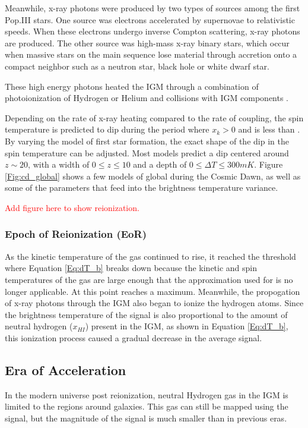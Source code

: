Meanwhile, x-ray photons were produced by two types of sources among the first Pop.III stars. One source was electrons accelerated by supernovae to relativistic speeds. When these electrons undergo inverse Compton scattering, x-ray photons are produced. The other source was high-mass x-ray binary stars, which occur when massive stars on the main sequence lose material through accretion onto a compact neighbor such as a neutron star, black hole or white dwarf star. 

These high energy photons heated the IGM through a combination of photoionization of Hydrogen or Helium and collisions with IGM components \cite{furlanetto_2006}. 

Depending on the rate of x-ray heating compared to the rate of \lya coupling, the spin temperature is predicted to dip during the period where $x_k>0$ and \tk is less than \tg. By varying the model of first star formation, the exact shape of the dip in the spin temperature can be adjusted. Most models predict a dip centered around $z\sim20$, with a width of $0 \leq z \leq 10$ and a depth of $0\leq \Delta T \leq 300 mK$. Figure \ref{Fig:cd_global} shows a few models of global \dtb during the Cosmic Dawn, as well as some of the parameters that feed into the brightness temperature variance. 

\textcolor{red}{Add figure here to show reionization.}

\subsubsection{Epoch of Reionization (EoR)}
As the kinetic temperature of the gas continued to rise, it reached the threshold where Equation \ref{Eq:dT_b} breaks down because the kinetic and spin temperatures of the gas are large enough that the approximation used for \tu is no longer applicable. At this point \dtb reaches a maximum. Meanwhile, the propogation of x-ray photons through the IGM also began to ionize the hydrogen atoms. Since the brightness temperature of the \cm signal is also proportional to the amount of neutral hydrogen ($x_{HI}$) present in the IGM, as shown in Equation \ref{Eq:dT_b}, this ionization process caused a gradual decrease in the average \cm signal. 

\subsection{Era of Acceleration}
In the modern universe post reionization, neutral Hydrogen gas in the IGM is limited to the regions around galaxies. This gas can still be mapped using the \cm signal, but the magnitude of the signal is much smaller than in previous eras. 

